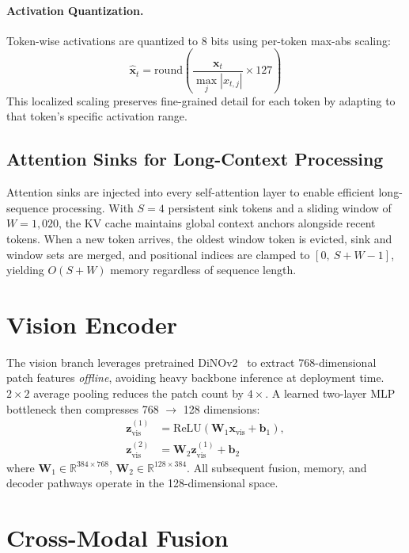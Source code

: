 \paragraph{Activation Quantization.} Token-wise activations are quantized to 8 bits using per-token max-abs scaling:
\begin{equation}
    \hat{\mathbf{x}}_t = \mathrm{round}\!\left(\frac{\mathbf{x}_t}{\max_j |x_{t,j}|} \times 127\right)
\end{equation}
This localized scaling preserves fine-grained detail for each token by adapting to that token's specific activation range.

\subsection{Attention Sinks for Long-Context Processing}
Attention sinks are injected into every self-attention layer to enable efficient long-sequence processing. With $S{=}4$ persistent sink tokens and a sliding window of $W{=}1{,}020$, the KV cache maintains global context anchors alongside recent tokens. When a new token arrives, the oldest window token is evicted, sink and window sets are merged, and positional indices are clamped to $[0,\ S + W - 1]$, yielding $O(S+W)$ memory regardless of sequence length.

\section{Vision Encoder}
\label{sec:bitmar_vision_encoder}

The vision branch leverages pretrained DiNOv2~\cite{oquab2024dinov2} to extract 768-dimensional patch features \emph{offline}, avoiding heavy backbone inference at deployment time. $2{\times}2$ average pooling reduces the patch count by $4\times$. A learned two-layer MLP bottleneck then compresses 768 $\rightarrow$ 128 dimensions:
\begin{align}
    \mathbf{z}^{(1)}_{\text{vis}} &= \mathrm{ReLU}(\mathbf{W}_1 \mathbf{x}_{\text{vis}} + \mathbf{b}_1), \\
    \mathbf{z}^{(2)}_{\text{vis}} &= \mathbf{W}_2 \mathbf{z}^{(1)}_{\text{vis}} + \mathbf{b}_2
\end{align}
where $\mathbf{W}_1 \in \mathbb{R}^{384 \times 768}$, $\mathbf{W}_2 \in \mathbb{R}^{128 \times 384}$. All subsequent fusion, memory, and decoder pathways operate in the 128-dimensional space.

\section{Cross-Modal Fusion}
\label{sec:bitmar_fusion}

